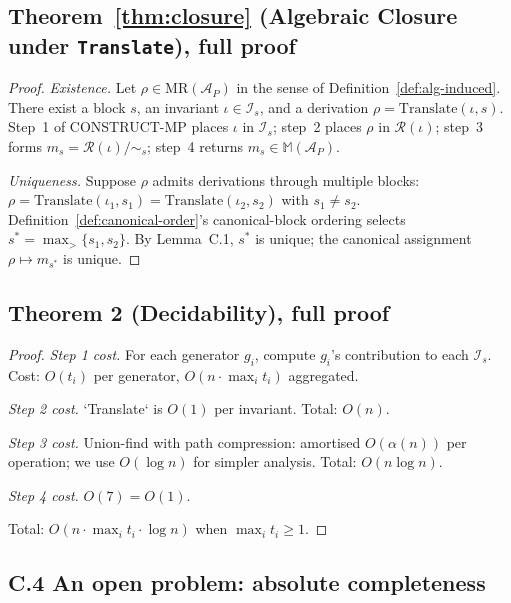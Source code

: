 \documentclass[acmsmall, screen]{acmart}
\begin{document}
\subsection*{Theorem~\ref{thm:closure} (Algebraic Closure under \texttt{Translate}), full proof}

\begin{proof}
\emph{Existence.} Let $\rho \in \mathrm{MR}(\mathcal{A}_P)$ in the sense of Definition~\ref{def:alg-induced}. There exist a block $s$, an invariant $\iota \in \mathcal{I}_s$, and a derivation $\rho = \mathrm{Translate}(\iota, s)$. Step~1 of CONSTRUCT-MP places $\iota$ in $\mathcal{I}_s$; step~2 places $\rho$ in $\mathcal{R}(\iota)$; step~3 forms $m_s = \mathcal{R}(\iota)/\!\sim_s$; step~4 returns $m_s \in \mathbb{M}(\mathcal{A}_P)$.

\emph{Uniqueness.} Suppose $\rho$ admits derivations through multiple blocks: $\rho = \mathrm{Translate}(\iota_1, s_1) = \mathrm{Translate}(\iota_2, s_2)$ with $s_1 \neq s_2$. Definition~\ref{def:canonical-order}'s canonical-block ordering selects $s^{*} = \max_{>}\{s_1, s_2\}$. By Lemma~C.1, $s^{*}$ is unique; the canonical assignment $\rho \mapsto m_{s^{*}}$ is unique.
\end{proof}

\subsection*{Theorem 2 (Decidability), full proof}

\begin{proof}
\emph{Step 1 cost.} For each generator $g_i$, compute $g_i$'s contribution to each $\mathcal{I}_s$. Cost: $O(t_i)$ per generator, $O(n \cdot \max_i t_i)$ aggregated.

\emph{Step 2 cost.} `Translate` is $O(1)$ per invariant. Total: $O(n)$.

\emph{Step 3 cost.} Union-find with path compression: amortised $O(\alpha(n))$ per operation; we use $O(\log n)$ for simpler analysis. Total: $O(n \log n)$.

\emph{Step 4 cost.} $O(7) = O(1)$.

Total: $O(n \cdot \max_i t_i \cdot \log n)$ when $\max_i t_i \ge 1$.
\end{proof}

\subsection*{C.4 An open problem: absolute completeness}
\end{document}
